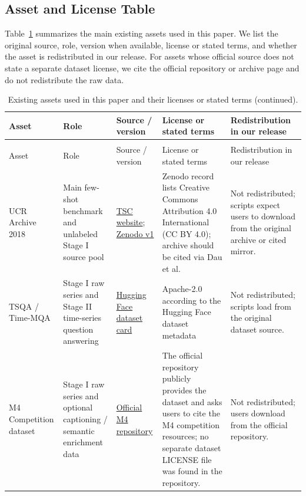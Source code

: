 \documentclass{article}
\begin{document}
\subsection{Asset and License Table}
\label{app:asset-license-table}

Table~\ref{tab:asset-license-table} summarizes the main existing assets used in this paper. We list the original source, role, version when available, license or stated terms, and whether the asset is redistributed in our release. For assets whose official source does not state a separate dataset license, we cite the official repository or archive page and do not redistribute the raw data.

\begingroup
\footnotesize
\setlength{\tabcolsep}{2pt}
\begin{longtable}{p{2.0cm}p{1.7cm}p{3.0cm}p{3.0cm}p{2.7cm}}
\caption{Existing assets used in this paper and their licenses or stated terms. URLs were checked during manuscript preparation.}
\label{tab:asset-license-table}\\
\toprule
Asset & Role & Source / version & License or stated terms & Redistribution in our release \\
\midrule
\endfirsthead
\caption[]{Existing assets used in this paper and their licenses or stated terms (continued).}\\
\toprule
Asset & Role & Source / version & License or stated terms & Redistribution in our release \\
\midrule
\endhead
\bottomrule
\endfoot
UCR Archive 2018 & Main few-shot benchmark and unlabeled Stage I source pool & \href{https://www.timeseriesclassification.com/}{TSC website}; \href{https://doi.org/10.5281/zenodo.11198697}{Zenodo v1} & Zenodo record lists Creative Commons Attribution 4.0 International (CC BY 4.0); archive should be cited via Dau et al. & Not redistributed; scripts expect users to download from the original archive or cited mirror. \\
TSQA / Time-MQA & Stage I raw series and Stage II time-series question answering & \href{https://huggingface.co/datasets/Time-MQA/TSQA}{Hugging Face dataset card} & Apache-2.0 according to the Hugging Face dataset metadata & Not redistributed; scripts load from the original dataset source. \\
M4 Competition dataset & Stage I raw series and optional captioning / semantic enrichment data & \href{https://github.com/Mcompetitions/M4-methods}{Official M4 repository} & The official repository publicly provides the dataset and asks users to cite the M4 competition resources; no separate dataset LICENSE file was found in the repository. & Not redistributed; users download from the official repository. \\

\end{longtable}
\end{document}
